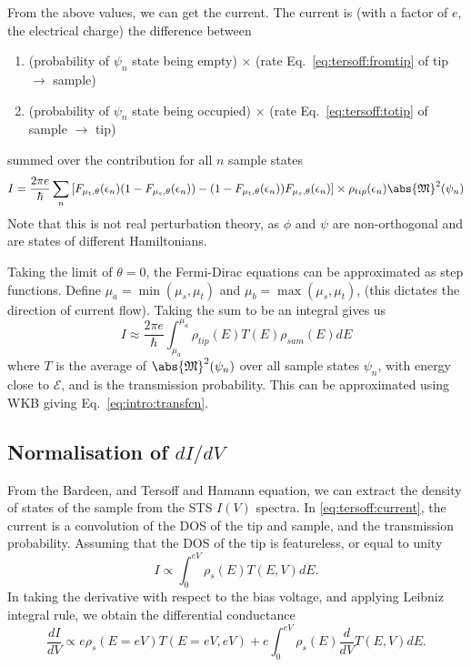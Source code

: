 From the above values, we can get the current. The current is (with a factor of $e$, the electrical charge) the difference between
\begin{enumerate}
\item (probability of $\psi_n$ state being empty) $\times$ (rate Eq.~\ref{eq:tersoff:fromtip} of tip $\rightarrow$ sample)
\item (probability of $\psi_n$ state being occupied) $\times$ (rate Eq.~\ref{eq:tersoff:totip} of sample $\rightarrow$ tip)
\end{enumerate}
summed over the contribution for all $n$ sample states
\begin{equation}
I = \frac{2\pi e}{\hbar}\sum_n \left[ F_{\mu_t,\theta}(\epsilon_n) (1-F_{\mu_s,\theta}(\epsilon_n)) - (1-F_{\mu_t, \theta}(\epsilon_n)) F_{\mu_s,\theta}(\epsilon_n)   \right] \times \rho_{tip}(\epsilon_n) \abs{\mathfrak{M}}^2(\psi_n)
\end{equation}
Note that this is not real perturbation theory, as $\phi$ and $\psi$ are non-orthogonal and are states of different Hamiltonians.

Taking the limit of $\theta=0$, the Fermi-Dirac equations can be approximated as step functions. Define $\mu_a = \min(\mu_s,\mu_t)$ and $\mu_b = \max(\mu_s,\mu_t)$, (this dictates the direction of current flow). Taking the sum to be an integral gives us
\begin{equation} \label{eq:tersoff:current}
I \approx \frac{2\pi e}{\hbar} \int_{\mu_a} ^{\mu_a} \rho_{tip}(E) T(E) \rho_{sam}(E) dE
\end{equation}
where $T$ is the average of $\abs{\mathfrak{M}}^2(\psi_n)$ over all sample states $\psi_n$, with energy close to $\mathcal{E}$, and is the transmission probability. This can be approximated using \ac{WKB} giving Eq.~\ref{eq:intro:transfcn}.


\subsection{Normalisation of $dI/dV$}

From the Bardeen, and Tersoff and Hamann equation, we can extract the density of states of the sample from the \ac{STS} $I(V)$ spectra. In \autoref{eq:tersoff:current}, the current is a convolution of the \ac{DOS} of the tip and sample, and the transmission probability. Assuming that the \ac{DOS} of the tip is featureless, or equal to unity
\begin{equation}
I \propto \int_0 ^{eV} \rho_s(E) T(E,V) dE.
\end{equation}
In taking the derivative with respect to the bias voltage, and applying Leibniz integral rule, we obtain the differential conductance
\begin{equation} \label{eq:feenstra:derivative}
\frac{dI}{dV} \propto e \rho_s(E=eV) T(E=eV,eV) + e \int_0^{eV} \rho_s(E) \frac{d}{dV} T(E,V) dE.
\end{equation}

